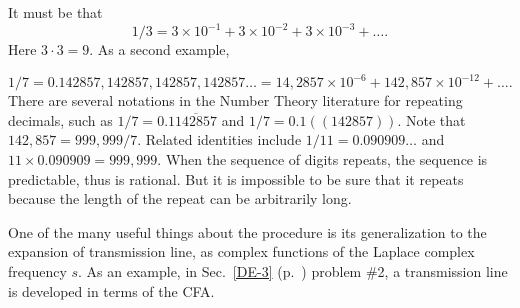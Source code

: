 \documentclass{ximera}
\begin{document}
It must be that
\[
1/3 = 3\times10^{-1} + 3\times10^{-2} + 3\times10^{-3} +\dots.
\]
Here $3\cdot3 = 9$.  As a second example,%


\[
1/7=0.142857,142857,142857,142857\dots = 14,2857\times10^{-6} +142,857\times10^{-12} + \dots.
\]
There are several notations in the Number Theory literature for repeating decimals, such as $1/7=0.1\overline{142857}$ and
$1/7=0.1((142857))$.
Note that $142,857=999,999/7$.  Related identities include $1/11=0.090909\dots$ and $11\times 0.090909=999,999$. 
When the sequence of digits repeats, the sequence is predictable, thus is rational.
But it is impossible to be sure that it repeats because the length of the repeat can be arbitrarily long.

 \comment
	{%
One of the many useful things about the procedure is its generalization to the expansion of
transmission line, as complex functions of the Laplace complex frequency $s$. As an example, in
   Sec.~\ref{DE-3} (p.~\pageref{DE-3}) problem \#2, %
a transmission line is developed in terms of the CFA.
	}


\end{document}

